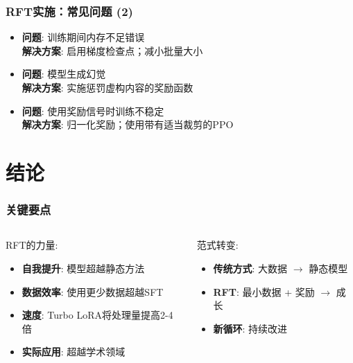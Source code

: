 \documentclass[aspectratio=169]{beamer}
\begin{document}
\begin{frame}[shrink=10]
	\frametitle{RFT实施：常见问题 (2)}
	\begin{itemize}
		\item \textbf{问题}: 训练期间内存不足错误\\
		  \textbf{解决方案}: 启用梯度检查点；减小批量大小
		\item \textbf{问题}: 模型生成幻觉\\
		  \textbf{解决方案}: 实施惩罚虚构内容的奖励函数
		\item \textbf{问题}: 使用奖励信号时训练不稳定\\
		  \textbf{解决方案}: 归一化奖励；使用带有适当裁剪的PPO
	\end{itemize}
\end{frame}

\section{结论}

\begin{frame}[shrink=60]
	\frametitle{关键要点}
	\vspace{-0.2cm}
	\begin{columns}[T]
		\begin{column}{0.48\textwidth}
			\begin{block}{RFT的力量:}
				\begin{itemize}\setlength{\itemsep}{-0.1em}
					\item \textbf{自我提升}: 模型超越静态方法
					\item \textbf{数据效率}: 使用更少数据超越SFT
					\item \textbf{速度}: Turbo LoRA将处理量提高2-4倍
					\item \textbf{实际应用}: 超越学术领域
				\end{itemize}
			\end{block}
		\end{column}
		\begin{column}{0.48\textwidth}
			\begin{block}{范式转变:}
				\begin{itemize}\setlength{\itemsep}{-0.1em}
					\item \textbf{传统方式}: 大数据 $\rightarrow$ 静态模型
					\item \textbf{RFT}: 最小数据 + 奖励 $\rightarrow$ 成长
					\item \textbf{新循环}: 持续改进
				\end{itemize}
			\end{block}
		\end{column}
	\end{columns}
\end{frame}
\end{document}
